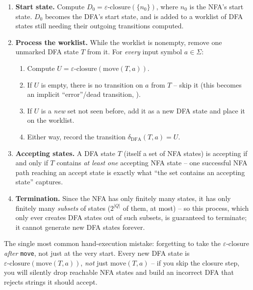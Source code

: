 \documentclass[full-course-notes.tex]{subfiles}
\begin{document}
\begin{coreidea}
\begin{enumerate}
  \item \textbf{Start state.} Compute $D_0 = \varepsilon\text{-closure}(\{n_0\})$, where $n_0$
  is the NFA's start state. $D_0$ becomes the DFA's start state, and is added to a worklist of
  DFA states still needing their outgoing transitions computed.
  \item \textbf{Process the worklist.} While the worklist is nonempty, remove one unmarked DFA
  state $T$ from it. For \emph{every} input symbol $a \in \Sigma$:
  \begin{enumerate}[label=(\alph*)]
    \item Compute $U = \varepsilon\text{-closure}(\text{move}(T, a))$.
    \item If $U$ is empty, there is no transition on $a$ from $T$ -- skip it (this becomes an
    implicit ``error''/dead transition, ).
    \item If $U$ is a \emph{new} set not seen before, add it as a new DFA state and place it on
    the worklist.
    \item Either way, record the transition $\delta_{\mathrm{DFA}}(T, a) = U$.
  \end{enumerate}
  \item \textbf{Accepting states.} A DFA state $T$ (itself a set of NFA states) is accepting if
  and only if $T$ contains \emph{at least one} accepting NFA state -- one successful NFA path
  reaching an accept state is exactly what ``the set contains an accepting state'' captures.
  \item \textbf{Termination.} Since the NFA has only finitely many states, it has only finitely
  many \emph{subsets} of states ($2^{|Q|}$ of them, at most) -- so this process, which only ever
  creates DFA states out of such subsets, is guaranteed to terminate; it cannot generate new DFA
  states forever.
\end{enumerate}
\end{coreidea}

\begin{examfocus}
The single most common hand-execution mistake: forgetting to take the $\varepsilon$-closure
\emph{after} \texttt{move}, not just at the very start. Every new DFA state is
$\varepsilon\text{-closure}(\text{move}(T,a))$, \emph{not} just $\text{move}(T,a)$ -- if you skip
the closure step, you will silently drop reachable NFA states and build an incorrect DFA that
rejects strings it should accept.
\end{examfocus}
\end{document}
